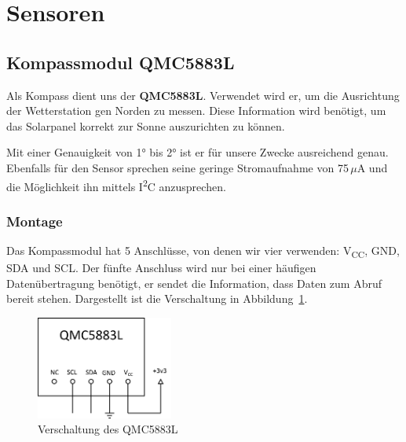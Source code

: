 \section{Sensoren}\label{sec:Sensoren}




\subsection{Kompassmodul QMC5883L}

Als Kompass dient uns der \textbf{QMC5883L}. Verwendet wird er, um die Ausrichtung der Wetterstation gen Norden zu messen. Diese Information wird benötigt, um das Solarpanel korrekt zur Sonne auszurichten zu können. 


Mit einer Genauigkeit von \ang{1} bis \ang{2} ist er für unsere Zwecke ausreichend genau. Ebenfalls für den Sensor sprechen seine geringe Stromaufnahme von 75\,$\mu$A und die Möglichkeit ihn mittels I\textsuperscript{2}C anzusprechen. 

\subsubsection{Montage}

Das Kompassmodul hat 5 Anschlüsse, von denen wir vier verwenden: V\textsubscript{CC}, GND, SDA und SCL. Der fünfte Anschluss wird nur bei einer häufigen Datenübertragung benötigt, er sendet die Information, dass Daten zum Abruf bereit stehen. Dargestellt ist die Verschaltung in Abbildung~\ref{fig:QMC5883L_Plan}.

\begin{figure}[H]
  \centering
  \includegraphics[width=0.4\textwidth]{./img/QMC5883L_Plan.png}
  \caption{Verschaltung des QMC5883L}\label{fig:QMC5883L_Plan}
\end{figure}

